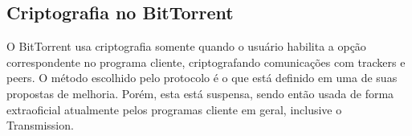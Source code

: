 
\subsection*{Criptografia no BitTorrent}

O BitTorrent usa criptografia somente quando o usuário habilita a opção correspondente
no programa cliente, criptografando comunicações com \glspl*{tracker} e \glspl*{peer}.
O método escolhido pelo protocolo é o que está definido em uma de suas propostas de
melhoria. Porém, esta está suspensa, sendo então usada de forma extraoficial atualmente
pelos programas cliente em geral, inclusive o Transmission.



